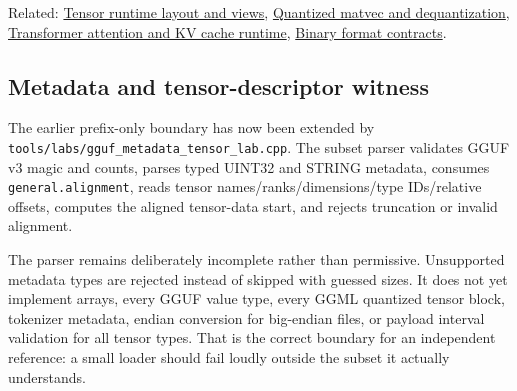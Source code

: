 Related: \hyperref[appendix-cebadf3106d1]{Tensor runtime layout and views}, \hyperref[appendix-241c0e42ac2d]{Quantized matvec and dequantization}, \hyperref[appendix-ea2dadd21ce5]{Transformer attention and KV cache runtime}, \hyperref[appendix-590bbb2424c1]{Binary format contracts}.

\subsection{Metadata and tensor-descriptor witness}\label{appendix-fef72dd246f2-metadata-and-tensor-descriptor-witness}

The earlier prefix-only boundary has now been extended by \texttt{tools/labs/gguf\_metadata\_tensor\_lab.cpp}. The subset parser validates GGUF v3 magic and counts, parses typed UINT32 and STRING metadata, consumes \texttt{general.alignment}, reads tensor names/ranks/dimensions/type IDs/relative offsets, computes the aligned tensor-data start, and rejects truncation or invalid alignment.

The parser remains deliberately incomplete rather than permissive. Unsupported metadata types are rejected instead of skipped with guessed sizes. It does not yet implement arrays, every GGUF value type, every GGML quantized tensor block, tokenizer metadata, endian conversion for big-endian files, or payload interval validation for all tensor types. That is the correct boundary for an independent reference: a small loader should fail loudly outside the subset it actually understands.
